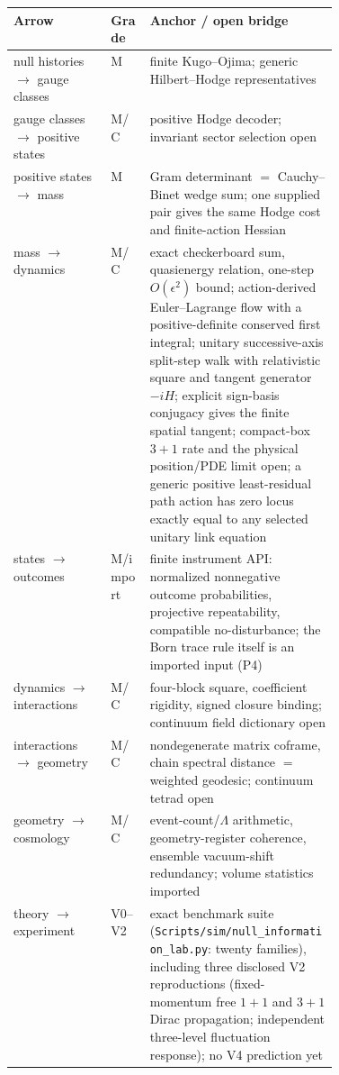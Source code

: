 \documentclass[11pt]{article}
\newcommand{\Mtag}{\textcolor{verified}{\textsc{M}}}
\newcommand{\Ctag}{\textcolor{conjectural}{\textsc{C}}}
\begin{document}
\begin{center}
\small
\begin{tabularx}{\linewidth}{@{}>{\raggedright\arraybackslash}p{0.30\linewidth}>{\raggedright\arraybackslash}p{0.12\linewidth}X@{}}
\toprule
Arrow & Grade & Anchor / open bridge\\
\midrule
null histories $\to$ gauge classes & \Mtag & finite Kugo--Ojima; generic
Hilbert--Hodge representatives\\
gauge classes $\to$ positive states & \Mtag/\Ctag & positive Hodge decoder;
invariant sector selection open\\
positive states $\to$ mass & \Mtag & Gram determinant $=$ Cauchy--Binet wedge
sum; one supplied pair gives the same Hodge cost and finite-action Hessian\\
mass $\to$ dynamics & \Mtag/\Ctag & exact checkerboard sum, quasienergy
relation, one-step $O(\epsilon^2)$ bound; action-derived Euler--Lagrange flow
with a positive-definite conserved first integral; unitary successive-axis
split-step walk with relativistic square and tangent generator $-iH$;
explicit sign-basis conjugacy gives the finite spatial tangent; compact-box
$3+1$ rate and the physical position/PDE limit open; a generic positive
least-residual path action has zero locus exactly equal to any selected
unitary link equation\\
states $\to$ outcomes & \Mtag/import & finite instrument API: normalized
nonnegative outcome probabilities, projective repeatability, compatible
no-disturbance; the Born trace rule itself is an imported input (P4)\\
dynamics $\to$ interactions & \Mtag/\Ctag & four-block square, coefficient
rigidity, signed closure binding; continuum field dictionary open\\
interactions $\to$ geometry & \Mtag/\Ctag & nondegenerate matrix coframe,
chain spectral distance $=$ weighted geodesic; continuum tetrad open\\
geometry $\to$ cosmology & \Mtag/\Ctag & event-count/$\Lambda$ arithmetic,
geometry-register coherence, ensemble vacuum-shift redundancy; volume
statistics imported\\
theory $\to$ experiment & V0--V2 & exact benchmark suite
(\texttt{Scripts/sim/null\_information\_lab.py}: twenty families),
including three disclosed V2 reproductions (fixed-momentum free $1+1$ and
$3+1$ Dirac propagation; independent three-level fluctuation response);
no V4 prediction yet\\
\bottomrule
\end{tabularx}
\end{center}
\end{document}
